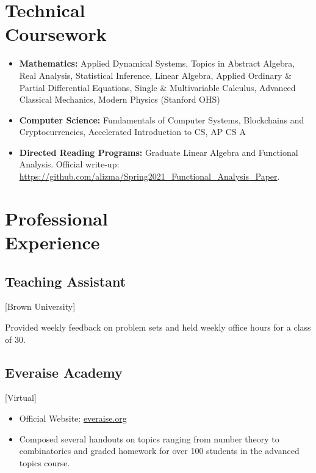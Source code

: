 \documentclass{mycv}
\begin{document}
\maketitle%

\section{Technical \\ Coursework}

\begin{itemize}
    \item \textbf{Mathematics:} Applied Dynamical Systems, Topics in Abstract Algebra, Real Analysis, Statistical Inference, Linear Algebra, Applied Ordinary \& Partial Differential Equations, Single \& Multivariable Calculus, Advanced Classical Mechanics, Modern Physics (Stanford OHS)
    \item \textbf{Computer Science:} Fundamentals of Computer Systems, Blockchains and Cryptocurrencies, Accelerated Introduction to CS, AP CS A 
    \item \textbf{Directed Reading Programs:} Graduate Linear Algebra and Functional Analysis. Official write-up: \url{https://github.com/alizma/Spring2021_Functional_Analysis_Paper}.
\end{itemize}

\section{Professional \\ Experience}

\subsection{Teaching Assistant}[Brown University]
\begin{positions}
\end{positions}
Provided weekly feedback on problem sets and held weekly office hours for a class of 30. 

\subsection{Everaise Academy}[Virtual]
\begin{positions}
\end{positions}

\begin{itemize}
  \item Official Website: \href{everaise.org}{everaise.org}
  \item Composed several handouts on topics ranging from number theory to combinatorics and graded homework for over 100 students in the advanced topics course.
\end{itemize}
\end{document}
